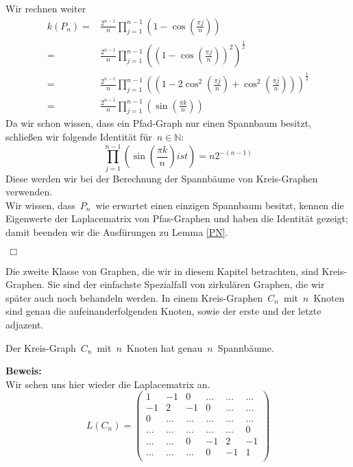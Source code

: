 Wir rechnen weiter
\begin{equation*}
\begin{split}
 \mathit{k}(P_n)={} & \frac{2^{n-1}}{n}\prod_{j=1}^{n-1} \left(1-\cos \left(\frac{\pi j}{n}\right)\right) \\
  ={}& \frac{2^{n-1}}{n}\prod_{j=1}^{n-1} \left(\left(1-\cos \left(\frac{\pi j}{n}\right)\right)^2\right)^{\frac{1}{2}} \\
  ={}&\frac{2^{n-1}}{n}\prod_{j=1}^{n-1} \left(\left(1-2\cos^2 \left(\frac{\pi j}{n}\right)+\cos^2 \left(\frac{\pi j}{n}\right)\right)\right)^{\frac{1}{2}} \\
  ={}& \frac{2^{n-1}}{n}\prod_{j=1}^{n-1} \left(\sin\left(\frac{\pi k}{n}\right) \right)
  \end{split}
\end{equation*}
Da wir schon wissen, dass ein Pfad-Graph nur einen Spannbaum besitzt, schließen wir folgende Identität für $\,n\in\mathbb{N}$:
\begin{equation}
 \prod_{j=1}^{n-1} \left(\sin\left(\frac{\pi k}{n}\right) ist \right)=n2^{-(n-1)}
 \label{fiktor}
\end{equation}
Diese werden wir bei der Berechnung der Spannbäume von Kreis-Graphen verwenden.\\ 
Wir wissen, dass $\,P_n\,$ wie erwartet einen einzigen Spannbaum besitzt, kennen die Eigenwerte der Laplacematrix von Pfas-Graphen und haben die Identität gezeigt; damit beenden wir die Ausfürungen zu Lemma \ref{PN}.
\begin{flushright} $\,\Box\,$ \end{flushright}
Die zweite Klasse von Graphen, die wir in diesem Kapitel betrachten, sind Kreis-Graphen.
Sie sind der einfachste Spezialfall von zirkulären Graphen, die wir später auch noch behandeln werden. In einem Kreis-Graphen $\,C_n\,$ mit $\,n\,$ Knoten sind genau die aufeinanderfolgenden Knoten, sowie der erste und der letzte adjazent. 
\begin{Lms}
 Der Kreis-Graph $\,C_n\,$ mit $\,n\,$ Knoten hat genau $\,n\,$ Spannbäume.
\end{Lms}
\textbf{Beweis:}\\
Wir sehen uns hier wieder die Laplacematrix an.\\
\begin{equation*}
L(C_n)=
\begin{pmatrix}
1&-1&0&\ldots&\ldots&\ldots\\
-1&2&-1&0&\ldots&\ldots\\
0&\ldots&\ldots&\ldots&\ldots&\ldots\\
\ldots&\ldots&\ldots&\ldots&\ldots&0\\
\ldots&\ldots&0&-1&2&-1\\
\ldots&\ldots&\ldots&0&-1&1\\
\end{pmatrix}
\end{equation*}
